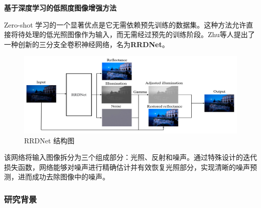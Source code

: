 \documentclass[CJK,aspectratio=169]{beamer}  %
\begin{document}
	\begin{frame}
		{ \yahei \textbf{基于深度学习的低照度图像增强方法}}
		
		{ \yahei Zero-shot 学习的一个显著优点是它无需依赖预先训练的数据集。这种方法允许直接将待处理的低光照图像作为输入，而无需经过预先的训练阶段。Zhu等人\textcolor{blue}{\citep{zhu2020zero}}提出了一种创新的三分支全卷积神经网络，名为\textbf{RRDNet}。}
		
		\begin{figure}
			\centering
			\setlength{\abovecaptionskip}{-0.05cm}
			\begin{minipage}{.6\columnwidth}
				\centering 
				\includegraphics[width=\columnwidth]{picture/LLIE/RRDNet/RRDNet}
				\caption{
					\tiny RRDNet 结构图
				}
			\end{minipage}
		\end{figure}
		
		{ \yahei 该网络将输入图像拆分为三个组成部分：光照、反射和噪声。通过特殊设计的迭代损失函数，网络能够对噪声进行精确估计并有效恢复光照部分，实现清晰的噪声预测，进而成功去除图像中的噪声。}
		
	\end{frame}
	
	\subsubsection{研究背景}
	
\end{document}
